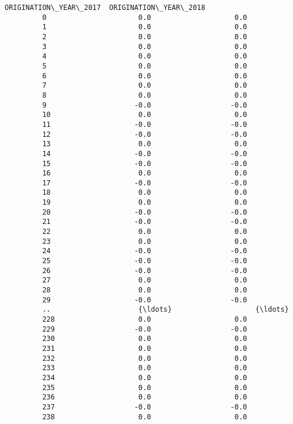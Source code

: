 \documentclass[11pt]{article}
\begin{document}
\begin{Verbatim}[commandchars=\\\{\}]
              ORIGINATION\_YEAR\_2017  ORIGINATION\_YEAR\_2018  
         0                      0.0                    0.0  
         1                      0.0                    0.0  
         2                      0.0                    0.0  
         3                      0.0                    0.0  
         4                      0.0                    0.0  
         5                      0.0                    0.0  
         6                      0.0                    0.0  
         7                      0.0                    0.0  
         8                      0.0                    0.0  
         9                     -0.0                   -0.0  
         10                     0.0                    0.0  
         11                    -0.0                   -0.0  
         12                    -0.0                   -0.0  
         13                     0.0                    0.0  
         14                    -0.0                   -0.0  
         15                    -0.0                   -0.0  
         16                     0.0                    0.0  
         17                    -0.0                   -0.0  
         18                     0.0                    0.0  
         19                     0.0                    0.0  
         20                    -0.0                   -0.0  
         21                    -0.0                   -0.0  
         22                     0.0                    0.0  
         23                     0.0                    0.0  
         24                    -0.0                   -0.0  
         25                    -0.0                   -0.0  
         26                    -0.0                   -0.0  
         27                     0.0                    0.0  
         28                     0.0                    0.0  
         29                    -0.0                   -0.0  
         ..                     {\ldots}                    {\ldots}  
         228                    0.0                    0.0  
         229                   -0.0                   -0.0  
         230                    0.0                    0.0  
         231                    0.0                    0.0  
         232                    0.0                    0.0  
         233                    0.0                    0.0  
         234                    0.0                    0.0  
         235                    0.0                    0.0  
         236                    0.0                    0.0  
         237                   -0.0                   -0.0  
         238                    0.0                    0.0  

\end{Verbatim}
\end{document}
